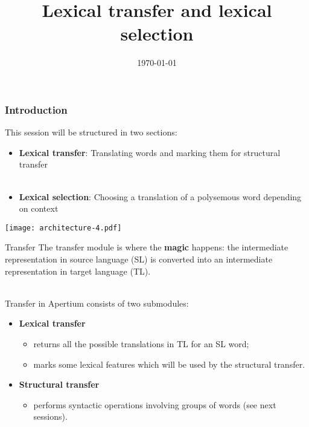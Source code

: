 \documentclass[10pt,xetex]{beamer} %
\date{\today}
\title{Lexical transfer and lexical selection}
\begin{document}
\begin{frame}
  \frametitle{Introduction}

This session will be structured in two sections:

\begin{itemize}
  \item {\bf Lexical transfer}: Translating words and marking them for structural transfer
~\\
~\\
  \item {\bf Lexical selection}: Choosing a translation of a polysemous word depending on context
\end{itemize}

\end{frame}

\begin{frame}

\begin{center}
\texttt{[image: architecture-4.pdf]}
\end{center}

\end{frame}

\begin{frame}

\begin{block}{Transfer}
The transfer module is where the \textbf{magic} happens: the intermediate
representation in source language (SL) is converted into an
intermediate representation in target language (TL).

\end{block}
~\\

Transfer in Apertium consists of two submodules:
~\\
\begin{itemize}
  \item {\bf Lexical transfer}
  \begin{itemize}
\item returns all the possible translations in TL for an SL word;
\item marks some lexical features which will be used by the structural transfer.
  \end{itemize}
  \item {\bf Structural transfer}
  \begin{itemize}
    \item performs syntactic operations involving groups of words (see next sessions).
  \end{itemize}
\end{itemize}

\end{frame}
\end{document}
